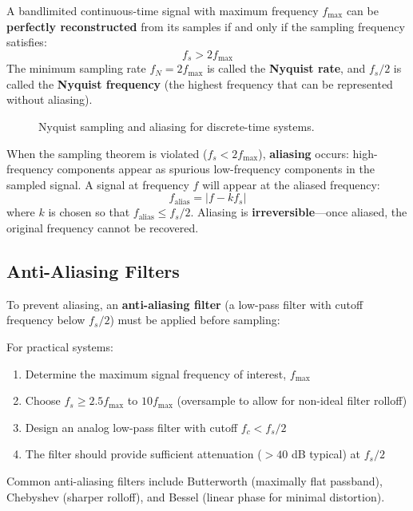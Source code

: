\begin{keyconceptbox}[title=Nyquist-Shannon Sampling Theorem]
A bandlimited continuous-time signal with maximum frequency $f_{\max}$ can be \textbf{perfectly reconstructed} from its samples if and only if the sampling frequency satisfies:
\begin{equation}
f_s > 2f_{\max}
\end{equation}
The minimum sampling rate $f_N = 2f_{\max}$ is called the \textbf{Nyquist rate}, and $f_s/2$ is called the \textbf{Nyquist frequency} (the highest frequency that can be represented without aliasing).
\end{keyconceptbox}

\begin{figure}[htbp]
\centering

\caption{Nyquist sampling and aliasing for discrete-time systems.}
\label{fig:nyquist_sampling_discrete}
\end{figure}

\begin{warningbox}[title=Aliasing]
When the sampling theorem is violated ($f_s < 2f_{\max}$), \textbf{aliasing} occurs: high-frequency components appear as spurious low-frequency components in the sampled signal. A signal at frequency $f$ will appear at the aliased frequency:
\begin{equation}
f_{\text{alias}} = \left| f - k f_s \right|
\end{equation}
where $k$ is chosen so that $f_{\text{alias}} \leq f_s/2$. Aliasing is \textbf{irreversible}---once aliased, the original frequency cannot be recovered.
\end{warningbox}

\subsection{Anti-Aliasing Filters}

To prevent aliasing, an \textbf{anti-aliasing filter} (a low-pass filter with cutoff frequency below $f_s/2$) must be applied before sampling:

\begin{practicalbox}[title=Anti-Aliasing Filter Design]
For practical systems:
\begin{enumerate}
    \item Determine the maximum signal frequency of interest, $f_{\max}$
    \item Choose $f_s \geq 2.5 f_{\max}$ to $10 f_{\max}$ (oversample to allow for non-ideal filter rolloff)
    \item Design an analog low-pass filter with cutoff $f_c < f_s/2$
    \item The filter should provide sufficient attenuation ($>40$ dB typical) at $f_s/2$
\end{enumerate}
Common anti-aliasing filters include Butterworth (maximally flat passband), Chebyshev (sharper rolloff), and Bessel (linear phase for minimal distortion).
\end{practicalbox}


